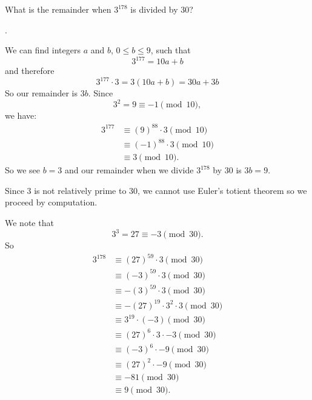 \documentclass[11pt]{article}
\begin{document}
\begin{problem}What is the remainder when $3^{178}$ is divided by 30?
\end{problem}
\begin{answer}
.
\end{answer}
\begin{solutionone}
We can find integers $a$ and $b$, $0 \leq b \leq 9$, such that
$$3^{177} = 10a+b$$
and therefore
$$3^{177} \cdot 3 = 3(10a+b) = 30a+3b$$
So our remainder is $3b$. Since
$$3^2 = 9 \equiv -1 \pmod{10},$$
we have:
\begin{align*}
3^{177} &\equiv (9)^{88} \cdot 3  \pmod{10} \\
&\equiv (-1)^{88} \cdot 3 \pmod{10} \\
&\equiv 3 \pmod{10}.
\end{align*}
So we see $b=3$ and our remainder when we divide $3^{178}$ by 30 is $3b = \boxed{9}$.
\end{solutionone}
\begin{solutiontwo}
Since 3 is not relatively prime to 30, we cannot use Euler's totient theorem so we proceed by computation. \par
We note that
$$3^3 = 27 \equiv -3 \pmod{30}.$$
So
\begin{align*}
3^{178} &\equiv (27)^{59} \cdot 3 \pmod{30} \\
&\equiv (-3)^{59} \cdot 3 \pmod{30}\\
&\equiv -(3)^{59} \cdot 3 \pmod{30}\\
&\equiv -(27)^{19} \cdot 3^2 \cdot 3 \pmod{30}\\
&\equiv 3^{19} \cdot (-3) \pmod{30}\\
&\equiv (27)^6 \cdot 3 \cdot -3  \pmod{30}\\
&\equiv (-3)^6 \cdot -9 \pmod{30}\\
&\equiv (27)^2 \cdot -9 \pmod{30}\\
&\equiv -81 \pmod{30}\\
&\equiv \boxed{9} \pmod{30}.
\end{align*}
\end{solutiontwo}
\end{document}
